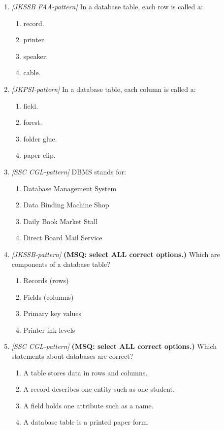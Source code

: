 \documentclass[11pt]{article}
\begin{document}
\begin{enumerate}[label=\textbf{Q\arabic*.}, leftmargin=*]
\item \textit{[JKSSB FAA-pattern]} In a database table, each row is called a:
  \begin{enumerate}[label=\Alph*.]
    \item record.
    \item printer.
    \item speaker.
    \item cable.
  \end{enumerate}
\item \textit{[JKPSI-pattern]} In a database table, each column is called a:
  \begin{enumerate}[label=\Alph*.]
    \item field.
    \item forest.
    \item folder glue.
    \item paper clip.
  \end{enumerate}
\item \textit{[SSC CGL-pattern]} DBMS stands for:
  \begin{enumerate}[label=\Alph*.]
    \item Database Management System
    \item Data Binding Machine Shop
    \item Daily Book Market Stall
    \item Direct Board Mail Service
  \end{enumerate}
\item \textit{[JKSSB-pattern]} \textbf{(MSQ: select ALL correct options.)} Which are components of a database table?
  \begin{enumerate}[label=\Alph*.]
    \item Records (rows)
    \item Fields (columns)
    \item Primary key values
    \item Printer ink levels
  \end{enumerate}
\item \textit{[SSC CGL-pattern]} \textbf{(MSQ: select ALL correct options.)} Which statements about databases are correct?
  \begin{enumerate}[label=\Alph*.]
    \item A table stores data in rows and columns.
    \item A record describes one entity such as one student.
    \item A field holds one attribute such as a name.
    \item A database table is a printed paper form.
  \end{enumerate}
\end{enumerate}
\def\JKSSBLessonID{28}\def\JKSSBAnswers{0}
\end{document}
